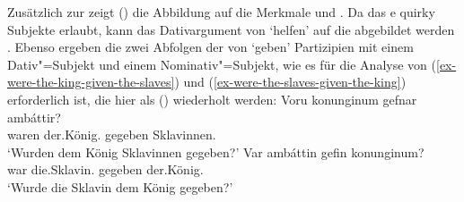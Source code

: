 \ea\label{da-repr-hm-Icelandic-two}%
\z
Zusätzlich zur \argstl zeigt () die Abbildung auf die Merkmale \spr und \comps. Da
das e quirky Subjekte erlaubt, kann das Dativargument von `helfen' auf die
\sprl abgebildet werden \citep[--148]{Wechsler95a-u}. Ebenso ergeben die zwei Abfolgen der \argst von `geben' Partizipien mit einem Dativ"=Subjekt und einem Nominativ"=Subjekt, wie es für die Analyse von (\ref{ex-were-the-king-given-the-slaves}) und (\ref{ex-were-the-slaves-given-the-king}) erforderlich ist, die hier
als () wiederholt werden:
\eal
\ex\label{ex-were-the-king-given-the-slaves-two}
\gll Voru konunginum gefnar ambáttir?\\
     waren der.König.\DAT{} gegeben Sklavinnen.\NOM{}\\\icelandic
\glt `Wurden dem König Sklavinnen gegeben?'
\ex\label{ex-were-the-slaves-given-the-king-two}
\gll Var ambáttin gefin konunginum?\\
     war die.Sklavin.\NOM{} gegeben der.König.\DAT\\
\glt `Wurde die Sklavin dem König gegeben?'
\zl

